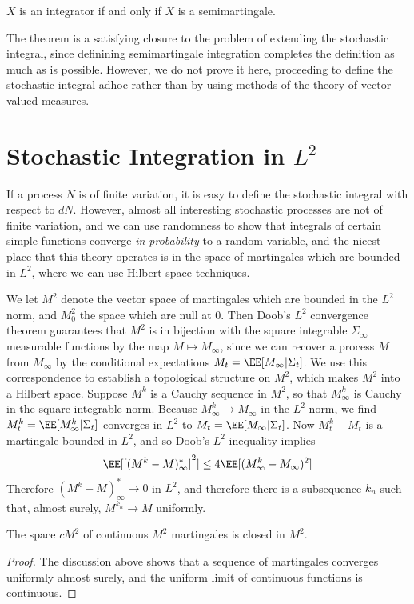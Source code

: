 \begin{theorem}
    $X$ is an integrator if and only if $X$ is a semimartingale.
\end{theorem}

The theorem is a satisfying closure to the problem of extending the stochastic integral, since definining semimartingale integration completes the definition as much as is possible. However, we do not prove it here, proceeding to define the stochastic integral adhoc rather than by using methods of the theory of vector-valued measures.

\section{Stochastic Integration in $L^2$}

If a process $N$ is of finite variation, it is easy to define the stochastic integral with respect to $dN$. However, almost all interesting stochastic processes are not of finite variation, and we can use randomness to show that integrals of certain simple functions converge {\it in probability} to a random variable, and the nicest place that this theory operates is in the space of martingales which are bounded in $L^2$, where we can use Hilbert space techniques.

We let $M^2$ denote the vector space of martingales which are bounded in the $L^2$ norm, and $M^2_0$ the space which are null at 0. Then Doob's $L^2$ convergence theorem guarantees that $M^2$ is in bijection with the square integrable $\Sigma_\infty$ measurable functions by the map $M \mapsto M_\infty$, since we can recover a process $M$ from $M_\infty$ by the conditional expectations $M_t = \EE[M_\infty|\Sigma_t]$. We use this correspondence to establish a topological structure on $M^2$, which makes $M^2$ into a Hilbert space. Suppose $M^k$ is a Cauchy sequence in $M^2$, so that $M^k_\infty$ is Cauchy in the square integrable norm. Because $M^k_\infty \to M_\infty$ in the $L^2$ norm, we find $M^k_t = \EE[M^k_\infty|\Sigma_t]$ converges in $L^2$ to $M_t = \EE[M_\infty|\Sigma_t]$. Now $M^k_t - M_t$ is a martingale bounded in $L^2$, and so Doob's $L^2$ inequality implies
%
\[ \EE[[(M^k - M)^*_\infty]^2] \leq 4 \EE[(M^k_\infty - M_\infty)^2] \]
%
Therefore $(M^k - M)^*_\infty \to 0$ in $L^2$, and therefore there is a subsequence $k_n$ such that, almost surely, $M^{k_n} \to M$ uniformly.

\begin{lemma}
    The space $cM^2$ of continuous $M^2$ martingales is closed in $M^2$.
\end{lemma}
\begin{proof}
    The discussion above shows that a sequence of martingales converges uniformly almost surely, and the uniform limit of continuous functions is continuous.
\end{proof}

